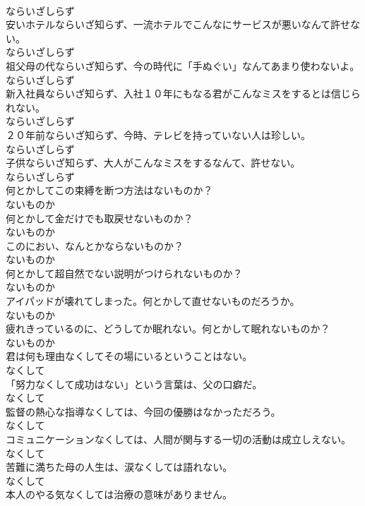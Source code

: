 \documentclass[8pt]{extreport}
\begin{document}
\begin{CJK}{UTF8}{min}
\\	ならいざしらず	
\\	安いホテルならいざ知らず、一流ホテルでこんなにサービスが悪いなんて許せない。	
\\	ならいざしらず	
\\	祖父母の代ならいざ知らず、今の時代に「手ぬぐい」なんてあまり使わないよ。	
\\	ならいざしらず	
\\	新入社員ならいざ知らず、入社１０年にもなる君がこんなミスをするとは信じられない。	
\\	ならいざしらず	
\\	２０年前ならいざ知らず、今時、テレビを持っていない人は珍しい。	
\\	ならいざしらず	
\\	子供ならいざ知らず、大人がこんなミスをするなんて、許せない。	
\\	ならいざしらず	
\\	何とかしてこの束縛を断つ方法はないものか？	
\\	ないものか	
\\	何とかして金だけでも取戻せないものか？	
\\	ないものか	
\\	このにおい、なんとかならないものか？	
\\	ないものか	
\\	何とかして超自然でない説明がつけられないものか？	
\\	ないものか	
\\	アイパッドが壊れてしまった。何とかして直せないものだろうか。	
\\	ないものか	
\\	疲れきっているのに、どうしてか眠れない。何とかして眠れないものか？	
\\	ないものか	
\\	君は何も理由なくしてその場にいるということはない。	
\\	なくして	
\\	「努力なくして成功はない」という言葉は、父の口癖だ。	
\\	なくして	
\\	監督の熱心な指導なくしては、今回の優勝はなかっただろう。	
\\	なくして	
\\	コミュニケーションなくしては、人間が関与する一切の活動は成立しえない。	
\\	なくして	
\\	苦難に満ちた母の人生は、涙なくしては語れない。	
\\	なくして	
\\	本人のやる気なくしては治療の意味がありません。	

\end{CJK}
\end{document}
